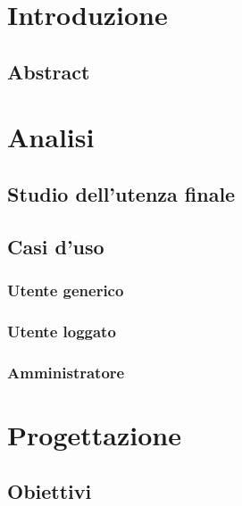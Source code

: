\documentclass[a4paper]{article}
\begin{document}
    \copertina

    \tableofcontents

    \newpage

    \section{Introduzione}
	    	\subsection{Abstract}
		    	

	\newpage

	\section{Analisi}
		\subsection{Studio dell'utenza finale}
			
		\subsection{Casi d'uso}
			
			\subsubsection{Utente generico}
				
			\subsubsection{Utente loggato}
				
			\subsubsection{Amministratore}
				

	\newpage

	\section{Progettazione}
		\subsection{Obiettivi}
			
\end{document}
